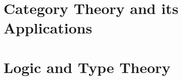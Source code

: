 \documentclass[12pt]{report}
\begin{document}









\part{Category Theory and its Applications}\label{part:category-theory-its}



\part{Logic and Type Theory}\label{part:logic-type-theory}


\printindex
\printbibliography%
\end{document}
